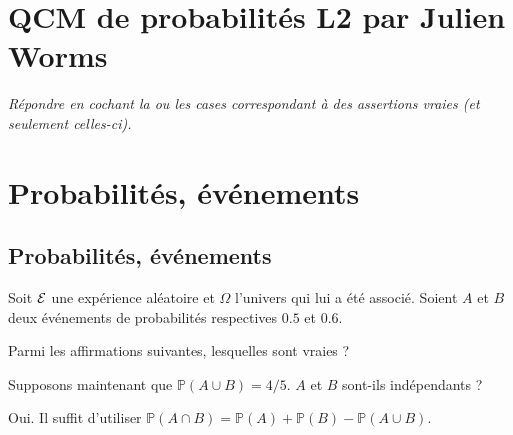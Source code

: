 
\section*{QCM de probabilités L2 par Julien Worms}

\textit{Répondre en cochant la ou les cases correspondant à
des assertions vraies (et seulement celles-ci).}


\section{Probabilités, événements}

\subsection{Probabilités, événements}

Soit ${\cal E}$ une expérience aléatoire et $\Omega$ l'univers qui lui a été associé. Soient $A$ et $B$ deux événements de probabilités respectives $0.5$ et $0.6$.

\begin{question}
Parmi les affirmations suivantes, lesquelles sont vraies ?
\begin{answers}
\end{answers}
\end{question}


\begin{question}
Supposons maintenant que $\mathbb{P}(A\cup B)=4/5$. $A$ et $B$ sont-ils indépendants ?
\begin{answers}
\end{answers}
\begin{explanations}
Oui. Il suffit d'utiliser $\mathbb{P}(A \cap B) = \mathbb{P}(A)+\mathbb{P}(B) - \mathbb{P}(A\cup B)$.
\end{explanations}
\end{question}


